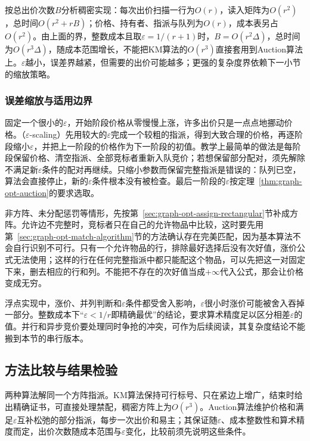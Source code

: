 按总出价次数$B$分析稠密实现：每次出价扫描一行为$O(r)$，读入矩阵为$O(r^2)$，总时间$O(r^2+rB)$；价格、持有者、指派与队列为$O(r)$，成本表另占$O(r^2)$。由上面的界，整数成本且取$\varepsilon=1/(r+1)$时，$B=O(r^2\Delta)$，总时间为$O(r^3\Delta)$，随成本范围增长，不能把KM算法的$O(r^3)$直接套用到Auction算法上。$\varepsilon$越小，误差界越紧，但需要的出价可能越多；更强的复杂度界依赖下一小节的缩放策略。

\subsubsection{误差缩放与适用边界}

固定一个很小的$\varepsilon$，开始阶段价格从零慢慢上涨，许多出价只是一点点地挪动价格。（$\varepsilon$-scaling）先用较大的$\varepsilon$完成一个较粗的指派，得到大致合理的价格，再逐阶段缩小$\varepsilon$，并把上一阶段的价格作为下一阶段的初值。教学上最简单的做法是每阶段保留价格、清空指派、全部竞标者重新入队竞价；若想保留部分配对，须先解除不满足新$\varepsilon$条件的配对再继续。只缩小参数而保留完整指派是错误的：队列已空，算法会直接停止，新的$\varepsilon$条件根本没有被检查。最后一阶段的$\varepsilon$按定理~\ref{thm:graph-opt-auction}的要求选取。

非方阵、未分配惩罚等情形，先按第~\ref{sec:graph-opt-assign-rectangular}节补成方阵。允许边不完整时，竞标者只在自己的允许物品中比较，这时要先用第~\ref{sec:graph-opt-match-algorithm}节的方法确认存在完美匹配，因为基本算法不会自行识别不可行。只有一个允许物品的行，排除最好选择后没有次好值，涨价公式无法使用；这样的行在任何完整指派中都只能配这个物品，可以先把这一对固定下来，删去相应的行和列。不能把不存在的次好值当成$+\infty$代入公式，那会让价格变成无穷。

浮点实现中，涨价、并列判断和$\varepsilon$条件都受舍入影响，$\varepsilon$很小时涨价可能被舍入吞掉一部分。整数成本下“$\varepsilon<1/r$即精确最优”的结论，要求算术精度足以区分相差$\varepsilon$的值。并行和异步竞价要处理同时争抢的冲突，可作为后续阅读，其复杂度结论不能搬到本节的串行版本。

\subsection{方法比较与结果检验}
\label{sec:graph-opt-assign-analysis}

两种算法解同一个方阵指派。KM算法保持可行标号、只在紧边上增广，结束时给出精确证书，可直接处理禁配，稠密方阵上为$O(r^3)$。Auction算法维护价格和满足$\varepsilon$互补松弛的部分指派，每步一次出价和易主；其保证随$\varepsilon$、成本整数性和算术精度而定，出价次数随成本范围与$\varepsilon$变化，比较前须先说明这些条件。

